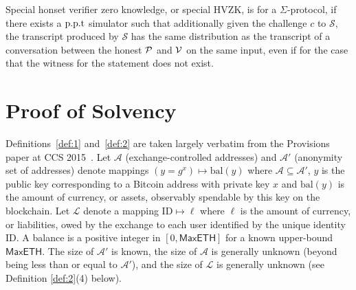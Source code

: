 \begin{definition}
Special honset verifier zero knowledge, or special HVZK, is for a $\Sigma$-protocol, if there exists a $\text{p.p.t}$ simulator such that additionally given the challenge $c$ to $\mathcal{S}$, the transcript produced by $\mathcal{S}$ has the same distribution as the transcript of a conversation between the honest $\mathcal{P}$ and $\mathcal{V}$ on the same input, even if for the case that the witness for the statement does not exist.
\end{definition}

\section{Proof of Solvency}
\label{app:defs}

Definitions~\ref{def:1} and~\ref{def:2} are taken largely verbatim from the Provisions paper at CCS 2015~\cite{provisions}. Let $\mathcal{A}$ (exchange-controlled addresses) and $\mathcal{A}'$ (anonymity set of addresses) denote mappings $(y = g^x) \mapsto \text{bal}(y)$ where $\mathcal{A} \subseteq \mathcal{A}'$, $y$ is the public key corresponding to a Bitcoin address with private key $x$ and $\text{bal}(y)$ is the amount of currency, or assets, observably spendable by this key on the blockchain. Let $\mathcal{L}$ denote a mapping $\text{ID} \mapsto \ell$ where $\ell$ is the amount of currency, or liabilities, owed by the exchange to each user identified by the unique identity ID. A balance is a positive integer in $[0,\mathsf{MaxETH}]$ for a known upper-bound $\mathsf{MaxETH}$. The size of $\mathcal{A}'$ is known, the size of $\mathcal{A}$ is generally unknown (beyond being less than or equal to $\mathcal{A}'$), and the size of $\mathcal{L}$ is generally unknown (see Definition \ref{def:2}(4) below). 

